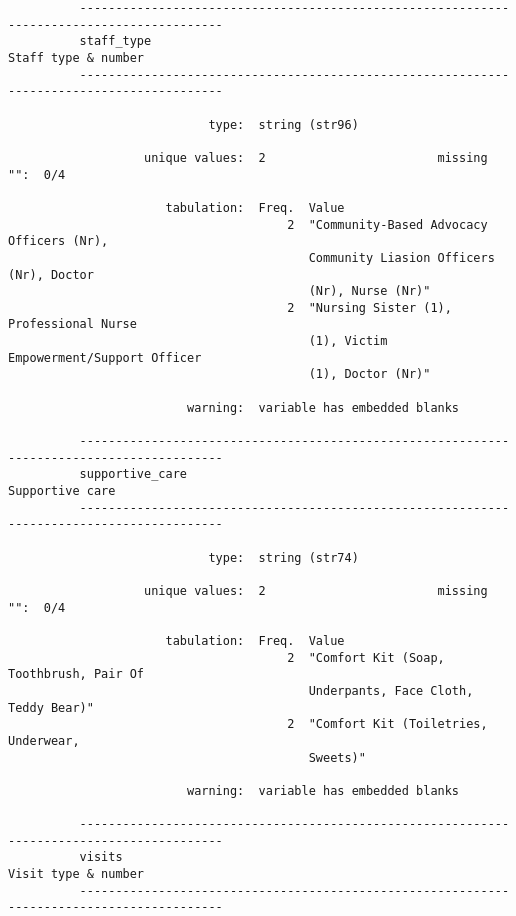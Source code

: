 \documentclass{article}
\begin{document}
\begin{verbatim}
          ------------------------------------------------------------------------------------------
          staff_type                                                             Staff type & number
          ------------------------------------------------------------------------------------------
          
                            type:  string (str96)
          
                   unique values:  2                        missing "":  0/4
          
                      tabulation:  Freq.  Value
                                       2  "Community-Based Advocacy Officers (Nr),
                                          Community Liasion Officers (Nr), Doctor
                                          (Nr), Nurse (Nr)"
                                       2  "Nursing Sister (1), Professional Nurse
                                          (1), Victim Empowerment/Support Officer
                                          (1), Doctor (Nr)"
          
                         warning:  variable has embedded blanks
          
          ------------------------------------------------------------------------------------------
          supportive_care                                                            Supportive care
          ------------------------------------------------------------------------------------------
          
                            type:  string (str74)
          
                   unique values:  2                        missing "":  0/4
          
                      tabulation:  Freq.  Value
                                       2  "Comfort Kit (Soap, Toothbrush, Pair Of
                                          Underpants, Face Cloth, Teddy Bear)"
                                       2  "Comfort Kit (Toiletries, Underwear,
                                          Sweets)"
          
                         warning:  variable has embedded blanks
          
          ------------------------------------------------------------------------------------------
          visits                                                                 Visit type & number
          ------------------------------------------------------------------------------------------
          

\end{verbatim}
\end{document}
